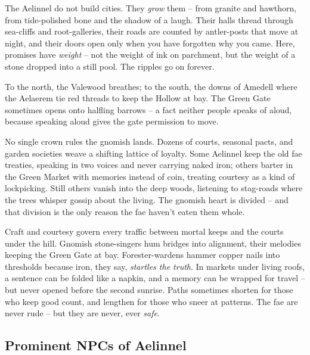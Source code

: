 \documentclass[12pt,oneside]{book}
\begin{document}
\begin{tcolorbox}[colback=black!3,colframe=blue!60!black,title={Stone, Bough, and Bright Things},breakable]
The Aelinnel do not build cities. They \emph{grow} them -- from granite and hawthorn, from tide-polished bone and the shadow of a laugh. Their halls thread through sea-cliffs and root-galleries, their roads are counted by antler-posts that move at night, and their doors open only when you have forgotten why you came. Here, promises have \emph{weight} -- not the weight of ink on parchment, but the weight of a stone dropped into a still pool. The ripples go on forever.

To the north, the Valewood breathes; to the south, the downs of Amedell where the Aelaerem tie red threads to keep the Hollow at bay. The Green Gate sometimes opens onto halfling barrows -- a fact neither people speaks of aloud, because speaking aloud gives the gate permission to move.

No single crown rules the gnomish lands. Dozens of courts, seasonal pacts, and garden societies weave a shifting lattice of loyalty. Some Aelinnel keep the old fae treaties, speaking in two voices and never carrying naked iron; others barter in the Green Market with memories instead of coin, treating courtesy as a kind of lockpicking. Still others vanish into the deep woods, listening to stag-roads where the trees whisper gossip about the living. The gnomish heart is divided -- and that division is the only reason the fae haven't eaten them whole.

Craft and courtesy govern every traffic between mortal keeps and the courts under the hill. Gnomish stone-singers hum bridges into alignment, their melodies keeping the Green Gate at bay. Forester-wardens hammer copper nails into thresholds because iron, they say, \emph{startles the truth}. In markets under living roofs, a sentence can be folded like a napkin, and a memory can be wrapped for travel -- but never opened before the second sunrise. Paths sometimes shorten for those who keep good count, and lengthen for those who sneer at patterns. The fae are never rude -- but they are never, ever \emph{safe}.
\end{tcolorbox}

\subsection*{Prominent NPCs of Aelinnel}
\label{sec:aelinnel-npcs}
\end{document}
